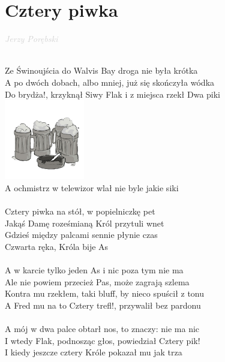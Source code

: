 \documentclass[a5paper, 10pt]{book}
\begin{document}
\section{Cztery piwka}\textcolor{lightgray}{\textit{Jerzy Porębski}}\\~\\
\begin{minipage}[t]{0.85\textwidth}
  Ze Świnoujścia do Walvis Bay droga nie była krótka\\
  A po dwóch dobach, albo mniej, już się skończyła wódka\\
  Do brydża!, krzyknął Siwy Flak i z miejsca rzekł Dwa piki\\
  \includegraphics[height=35mm,right]{images/cztery_piwka.png}\vspace*{-36mm}\\
  A ochmistrz w telewizor wlał nie byle jakie siki\\
  \\
  \hspace*{5mm}Cztery piwka na stół, w popielniczkę pet\\
  \hspace*{5mm}Jakąś Damę roześmianą Król przytuli wnet\\
  \hspace*{5mm}Gdzieś między palcami sennie płynie czas\\
  \hspace*{5mm}Czwarta ręka, Króla bije As\\
  \\
  A w karcie tylko jeden As i nic poza tym nie ma\\
  Ale nie powiem przecież Pas, może zagrają szlema\\
  Kontra mu rzekłem, taki bluff, by nieco spuścił z tonu\\
  A Fred mu na to Cztery trefl!, przywalił bez pardonu\\
  \\
  A mój w dwa palce obtarł nos, to znaczy: nie ma nic\\
  I wtedy Flak, podnosząc głos, powiedział Cztery pik!\\
  I kiedy jeszcze cztery Króle pokazał mu jak trza\\

\end{minipage}
\end{document}
